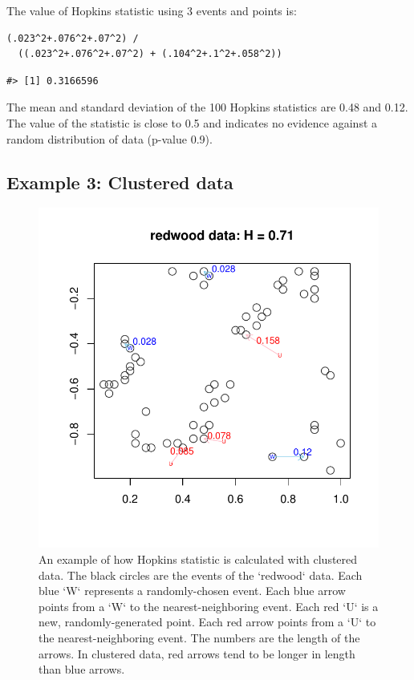 The value of Hopkins statistic using 3 events and points is:

\begin{verbatim}
(.023^2+.076^2+.07^2) /
  ((.023^2+.076^2+.07^2) + (.104^2+.1^2+.058^2))
\end{verbatim}

\begin{verbatim}
#> [1] 0.3166596
\end{verbatim}

The mean and standard deviation of the 100 Hopkins statistics are 0.48 and 0.12. The value of the statistic is close to 0.5 and indicates no evidence against a random distribution of data (p-value 0.9).

\hypertarget{example-3-clustered-data}{%
\subsection{Example 3: Clustered data}\label{example-3-clustered-data}}

\begin{figure}

{\centering \includegraphics[width=0.6\linewidth]{hopkins_files/figure-latex/redwood-1} 

}

\caption{An example of how Hopkins statistic is calculated with clustered data. The black circles are the events of the `redwood` data. Each blue `W` represents a randomly-chosen event. Each blue arrow points from a `W` to the nearest-neighboring event. Each red `U` is a new, randomly-generated point. Each red arrow points from a `U` to the nearest-neighboring event. The numbers are the length of the arrows. In clustered data, red arrows tend to be longer in length than blue arrows.}\label{fig:redwood}
\end{figure}

